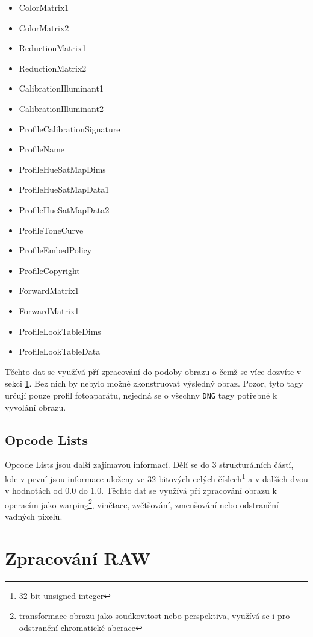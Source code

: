 \documentclass[12pt,a4paper,titlepage,final]{report}
\begin{document}
\begin{itemize}
	\item ColorMatrix1
	\item ColorMatrix2
	\item ReductionMatrix1
	\item ReductionMatrix2
	\item CalibrationIlluminant1
	\item CalibrationIlluminant2
	\item ProfileCalibrationSignature
	\item ProfileName
	\item ProfileHueSatMapDims
	\item ProfileHueSatMapData1
	\item ProfileHueSatMapData2
	\item ProfileToneCurve
	\item ProfileEmbedPolicy
	\item ProfileCopyright
	\item ForwardMatrix1
	\item ForwardMatrix1
	\item ProfileLookTableDims
	\item ProfileLookTableData
\end{itemize}

Těchto dat se využívá pří zpracování do podoby obrazu o čemž se více dozvíte v sekci \ref{sec:zpracovani-raw}. Bez nich by nebylo možné zkonstruovat výsledný obraz. Pozor, tyto tagy určují pouze profil fotoaparátu, nejedná se o všechny \verb|DNG| tagy potřebné k vyvolání obrazu.

\subsection{Opcode Lists}

Opcode Lists jsou další zajímavou informací. Dělí se do 3 strukturálních částí, kde v první jsou informace uloženy ve 32-bitových celých číslech\footnote{32-bit unsigned integer} a v dalších dvou v hodnotách od 0.0 do 1.0. Těchto dat se využívá při zpracování obrazu k operacím jako warping\footnote{transformace obrazu jako soudkovitost nebo perspektiva, využívá se i pro odstranění chromatické aberace}, vinětace, zvětšování, zmenšování nebo odstranění vadných pixelů.

\section{Zpracování RAW}\label{sec:zpracovani-raw}
\end{document}

